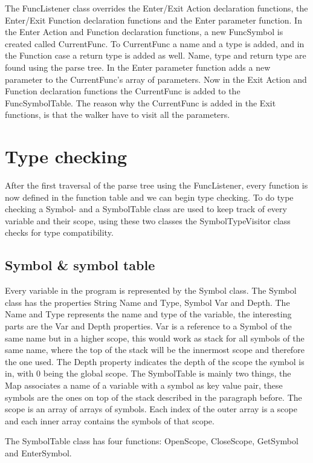 The FuncListener class overrides the Enter/Exit Action declaration functions, the Enter/Exit Function declaration functions and the Enter parameter function. In the Enter Action and Function declaration functions, a new FuncSymbol is created called CurrentFunc. To CurrentFunc a name and a type is added, and in the Function case a return type is added as well. Name, type and return type are found using the parse tree.
In the Enter parameter function adds a new parameter to the CurrentFunc's array of parameters. 
Now in the Exit Action and Function declaration functions the CurrentFunc is added to the FuncSymbolTable. 
The reason why the CurrentFunc is added in the Exit functions, is that the walker have to visit all the parameters. 

\section{Type checking} 
After the first traversal of the parse tree using the FuncListener, every function is now defined in the function table and we can begin type checking. To do type checking a Symbol- and a SymbolTable class are used to keep track of every variable and their scope, using these two classes the SymbolTypeVisitor class checks for type compatibility. 

\subsection{Symbol \& symbol table}
Every variable in the program is represented by the Symbol class. The Symbol class has the properties String Name and Type, Symbol Var and Depth. The Name and Type represents the name and type of the variable, the interesting parts are the Var and Depth properties. Var is a reference to a Symbol of the same name but in a higher scope, this would work as stack for all symbols of the same name, where the top of the stack will be the innermost scope and therefore the one used. The Depth property indicates the depth of the scope the symbol is in, with 0 being the global scope. 
The SymbolTable is mainly two things, the Map associates a name of a variable with a symbol as key value pair, these symbols are the ones on top of the stack described in the paragraph before. The scope is an array of arrays of symbols. Each index of the outer array is a scope and each inner array contains the symbols of that scope. 

The SymbolTable class has four functions: OpenScope, CloseScope, GetSymbol and EnterSymbol. 

